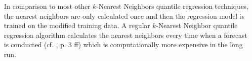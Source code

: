 In comparison to most other \(k\)-Nearest Neighbors quantile 
regression techniques, the nearest neighbors are only calculated once 
and then the regression model is trained on the modified training data. 
A regular \(k\)-Nearest Neighbor quantile regression algorithm 
calculates the nearest neighbors every time when a forecast is conducted 
(cf. \Textcite{Ma2015}, p. 3 ff) which is computationally more expensive in the long run.
